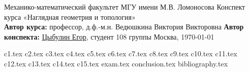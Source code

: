 \documentclass[a4paper, 12pt]{article}
\theoremstyle{plain}
\theoremstyle{definition}
\theoremstyle{remark}
\begin{document}
\begin{titlepage}
    \begin{center}
        \large Механико-математический факультет МГУ имени М.В. Ломоносова
        \vfill
        \Large Конспект курса «Наглядная геометрия и топология» \bigskip \\
        \large \textbf{Автор курса:} профессор, д.ф.-м.н. Ведюшкина Виктория Викторовна
        \textbf{Автор конспекта:} \href{https://github.com/betel-git}{Цыбулин Егор}, студент 108 группы
        \vfill
        Москва, \today
    \end{center}
\end{titlepage}
\tableofcontents
\newpage


{c1.tex}
{c2.tex}
\newpage
{c3.tex}
{c4.tex}
{c5.tex}
{c6.tex}
{c7.tex}
{c8.tex}
{c9.tex}
{c10.tex}
{c11.tex}
\newpage
{c12.tex}
{c13.tex}
{c14.tex}
{c15.tex}
\newpage
{exam.tex}
\newpage
{conclusion.tex}
\newpage
{bibliography.tex}
\end{document}
